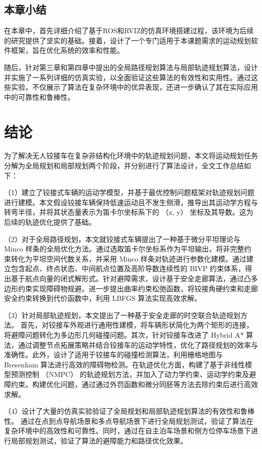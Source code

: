 \documentclass[master,academic]{ysuthesis} %
\begin{document}
	\section{本章小结}
	在本章中，首先详细介绍了基于ROS和RVIZ的仿真环境搭建过程，该环境为后续的研究提供了坚实的基础。接着，设计了一个专门适用于本课题需求的运动规划软件框架，旨在优化系统的效率和性能。

	随后，针对第三章和第四章中提出的全局路径规划算法与局部轨迹规划算法，设计并实施了一系列详细的仿真实验，以全面验证这些算法的有效性和实用性。通过这些实验，不仅展示了算法在复杂环境中的优异表现，还进一步确认了其在实际应用中的可靠性和鲁棒性。

	\chapter{结论}
	为了解决无人铰接车在复杂非结构化环境中的轨迹规划问题，本文将运动规划任务分解为全局规划和局部规划两个阶段，并分别进行了算法设计，全文工作总结如下：

	（1）建立了铰接式车辆的运动学模型，并基于最优控制问题框架对轨迹规划问题进行建模。本文假设铰接车辆保持低速运动且不发生侧滑，推导出其运动学方程与转弯半径，并将其状态量表示为笛卡尔坐标系下的 （x, y） 坐标及其导数。这为后续的轨迹优化提供了基础。

	（2）对于全局路径规划，本文就铰接式车辆提出了一种基于微分平坦理论与 Minco 样条的全局优化方法。通过选取笛卡尔坐标系作为平坦输出，将非完整约束转化为平坦空间代数关系，并采用 Minco 样条对轨迹进行参数化建模。通过建立包含起点、终点状态、中间航点位置及高阶导数连续性的 BIVP 约束体系，得出基于航点向量的闭式解形式。针对避障需求，设计基于安全走廊算法，通过凸多边形约束实现障碍物规避。进一步提出曲率约束松弛函数，将铰接角硬约束和走廊安全约束转换到代价函数中，利用 LBFGS 算法实现高效求解。

	（3）针对局部轨迹规划，本文提出了一种基于安全走廊的时空联合轨迹规划方法。 首先，对铰接车外观进行通用性建模，将车辆形状简化为两个矩形的连接，将避障问题转化为多边形几何碰撞问题。其次，针对铰接车改进了 Hybrid A* 算法，通过调整节点拓展策略并结合铰接车的运动学特性，优化了路径规划的效率与准确性。此外，设计了适用于铰接车的碰撞检测算法，利用栅格地图与 Bresenham 算法进行高效的障碍物检测。在轨迹优化方面，构建了基于非线性模型预测控制 （NMPC） 的轨迹规划方法，并加入了动力学约束、运动学约束及避障约束。构建优化问题，通过通过外罚函数和微分同胚等方法去除约束后进行高效求解。

	（4）设计了大量的仿真实验验证了全局规划和局部轨迹规划算法的有效性和鲁棒性。 通过在点到点导航场景和多点导航场景下进行全局规划测试，验证了算法在复杂环境中的高效性和可靠性。同时，通过在自主泊车场景和侧方位停车场景下进行局部规划测试，验证了算法的避障能力和路径优化效果。
\end{document}
